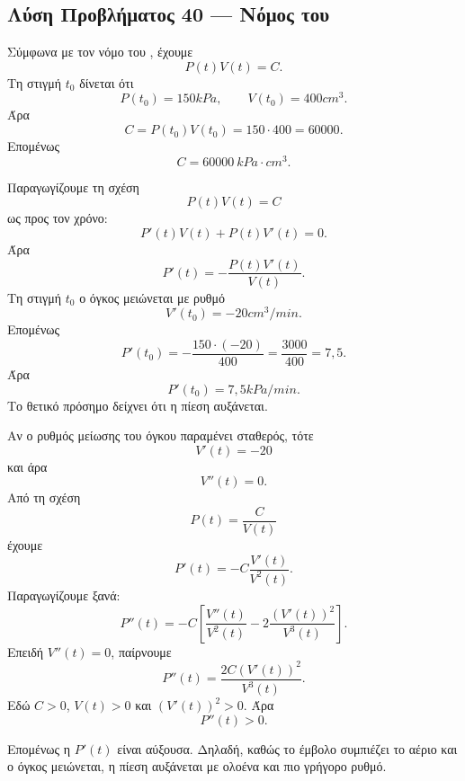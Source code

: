 \subsection*{Λύση Προβλήματος 40 --- Νόμος του }

\begin{alist}
  \item Σύμφωνα με τον νόμο του , έχουμε
        \[
          P(t)V(t)=C.
        \]
        Τη στιγμή $t_0$ δίνεται ότι
        \[
          P(t_0)=150\si{kPa},
          \qquad
          V(t_0)=400\si{cm^3}.
        \]
        Άρα
        \[
          C=P(t_0)V(t_0)=150\cdot400=60000.
        \]
        Επομένως
        \[
          {C=60000\ \si{kPa\cdot cm^3}}.
        \]

        Παραγωγίζουμε τη σχέση
        \[
          P(t)V(t)=C
        \]
        ως προς τον χρόνο:
        \[
          P'(t)V(t)+P(t)V'(t)=0.
        \]
        Άρα
        \[
          P'(t)=-\frac{P(t)V'(t)}{V(t)}.
        \]
        Τη στιγμή $t_0$ ο όγκος μειώνεται με ρυθμό
        \[
          V'(t_0)=-20\si{cm^3/min}.
        \]
        Επομένως
        \[
          P'(t_0)
          =
          -\frac{150\cdot(-20)}{400}
          =
          \frac{3000}{400}
          =
          7{,}5.
        \]
        Άρα
        \[
          {P'(t_0)=7{,}5\si{kPa/min}}.
        \]
        Το θετικό πρόσημο δείχνει ότι η πίεση αυξάνεται.

  \item Αν ο ρυθμός μείωσης του όγκου παραμένει σταθερός, τότε
        \[
          V'(t)=-20
        \]
        και άρα
        \[
          V''(t)=0.
        \]
        Από τη σχέση
        \[
          P(t)=\frac{C}{V(t)}
        \]
        έχουμε
        \[
          P'(t)
          =
          -C\frac{V'(t)}{V^2(t)}.
        \]
        Παραγωγίζουμε ξανά:
        \[
          P''(t)
          =
          -C\left[
            \frac{V''(t)}{V^2(t)}
            -2\frac{(V'(t))^2}{V^3(t)}
          \right].
        \]
        Επειδή $V''(t)=0$, παίρνουμε
        \[
          P''(t)
          =
          \frac{2C(V'(t))^2}{V^3(t)}.
        \]
        Εδώ $C>0$, $V(t)>0$ και $(V'(t))^2>0$. Άρα
        \[
          {P''(t)>0}.
        \]

        Επομένως η $P'(t)$ είναι αύξουσα. Δηλαδή, καθώς το έμβολο
        συμπιέζει το αέριο και ο όγκος μειώνεται, η πίεση αυξάνεται με
        ολοένα και πιο γρήγορο ρυθμό.
\end{alist}
